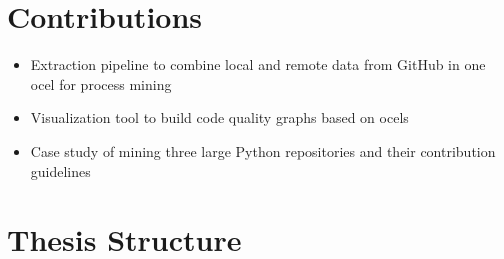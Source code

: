 \section{Contributions}
\label{sec:intro_ssec:c}
\begin{itemize}
	\item Extraction pipeline to combine local and remote data from GitHub in one \ac{ocel} for process mining
	\item Visualization tool to build code quality graphs based on \acp{ocel}
	\item Case study of mining three large Python repositories and their contribution guidelines
\end{itemize}


\section{Thesis Structure}
\label{sec:intro_ssec:ts}
